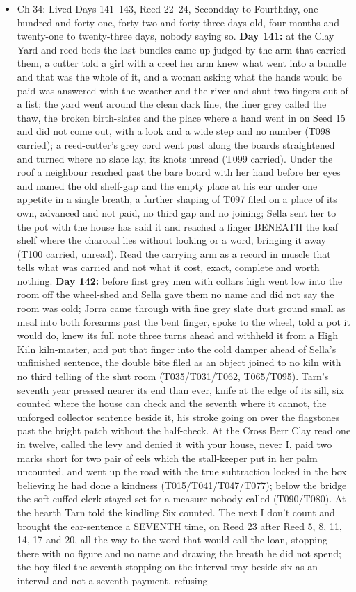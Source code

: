 \documentclass{design/chronicle}
\begin{document}
{\begin{itemize}[leftmargin=1.4em,itemsep=1pt,topsep=3pt,parsep=0pt]
\item Ch 34: Lived Days 141–143, Reed 22–24, Secondday to Fourthday, one hundred and forty-one, forty-two and forty-three days old, four months and twenty-one to twenty-three days, nobody saying so. \textbf{Day 141:} at the Clay Yard and reed beds the last bundles came up judged by the arm that carried them, a cutter told a girl with a creel her arm knew what went into a bundle and that was the whole of it, and a woman asking what the hands would be paid was answered with the weather and the river and shut two fingers out of a fist; the yard went around the clean dark line, the finer grey called the thaw, the broken birth-slates and the place where a hand went in on Seed 15 and did not come out, with a look and a wide step and no number (T098 carried); a reed-cutter’s grey cord went past along the boards straightened and turned where no slate lay, its knots unread (T099 carried). Under the roof a neighbour reached past the bare board with her hand before her eyes and named the old shelf-gap and the empty place at his ear under one appetite in a single breath, a further shaping of T097 filed on a place of its own, advanced and not paid, no third gap and no joining; Sella sent her to the pot with the house has said it and reached a finger BENEATH the loaf shelf where the charcoal lies without looking or a word, bringing it away (T100 carried, unread). Read the carrying arm as a record in muscle that tells what was carried and not what it cost, exact, complete and worth nothing. \textbf{Day 142:} before first grey men with collars high went low into the room off the wheel-shed and Sella gave them no name and did not say the room was cold; Jorra came through with fine grey slate dust ground small as meal into both forearms past the bent finger, spoke to the wheel, told a pot it would do, knew its full note three turns ahead and withheld it from a High Kiln kiln-master, and put that finger into the cold damper ahead of Sella’s unfinished sentence, the double bite filed as an object joined to no kiln with no third telling of the shut room (T035/T031/T062, T065/T095). Tarn’s seventh year pressed nearer its end than ever, knife at the edge of its sill, six counted where the house can check and the seventh where it cannot, the unforged collector sentence beside it, his stroke going on over the flagstones past the bright patch without the half-check. At the Cross Berr Clay read one in twelve, called the levy and denied it with your house, never I, paid two marks short for two pair of eels which the stall-keeper put in her palm uncounted, and went up the road with the true subtraction locked in the box believing he had done a kindness (T015/T041/T047/T077); below the bridge the soft-cuffed clerk stayed set for a measure nobody called (T090/T080). At the hearth Tarn told the kindling Six counted. The next I don’t count and brought the ear-sentence a SEVENTH time, on Reed 23 after Reed 5, 8, 11, 14, 17 and 20, all the way to the word that would call the loan, stopping there with no figure and no name and drawing the breath he did not spend; the boy filed the seventh stopping on the interval tray beside six as an interval and not a seventh payment, refusing 
\end{itemize}}
\end{document}
